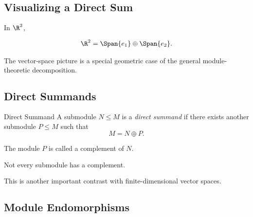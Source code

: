 \subsection{Visualizing a Direct Sum}
\label{subsec:direct-sum-visual}

In \(\R^2\),

\[ \R^2=\Span\{e_1\}\oplus\Span\{e_2\}. \]

\begin{center}
\end{center}

The vector-space picture is a special geometric case of the general
module-theoretic decomposition.

\subsection{Direct Summands}
\label{subsec:direct-summands}

\begin{definitionbox}{Direct Summand}
A submodule \(N\leq M\) is a \emph{direct summand} if there exists another
submodule \(P\leq M\) such that
\[ M=N\oplus P. \]
\end{definitionbox}

The module \(P\) is called a complement of \(N\).

Not every submodule has a complement.

This is another important contrast with finite-dimensional vector spaces.

\subsection{Module Endomorphisms}
\label{subsec:module-endomorphisms}

